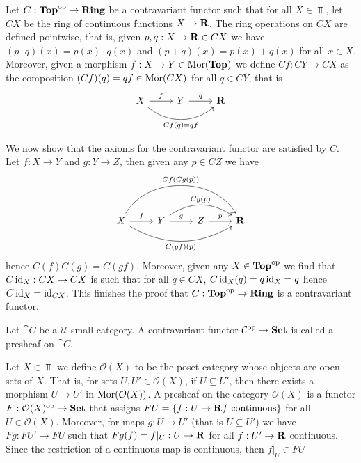 \begin{example}[\(\Top^\op \to \Rng\)]
Let \(C: {\textbf{Top}}^{\mathrm{op}} \to {\textbf{Ring}}\) be a contravariant functor such that
for all \(X \in \Top\), let \(C X\) be the ring of continuous functions
\(X \to \mathbf{R}\). The ring operations on \(C X\) are defined pointwise,
that is, given \(p, q: X \to \mathbf{R} \in C X\) we have \((p \cdot q) (x) =
p(x) \cdot q(x)\) and \((p + q)(x) = p(x) + q(x)\) for all \(x \in X\).
Moreover, given a morphism \(f: X \to Y \in \operatorname{Mor}({\textbf{Top}})\) we define \(C f:
C Y \to C X\) as the composition \((C f)(q) = q f \in \operatorname{Mor}(C X)\) for all \(q
\in C Y\), that is
\[
  \begin{tikzcd}
    X \ar[r, "f"] \ar[rr, bend right = 40, swap, "C f(q) = q f"]
    & Y \ar[r, "q"] & \R
  \end{tikzcd}
\]

We now show that the axioms for the contravariant functor are satisfied by
\(C\). Let \(f: X \to Y\) and \(g: Y \to Z\), then given any \(p \in C Z\) we
have
\[
  \begin{tikzcd}
    X \ar[r, "f"]
    \ar[rrr, bend left = 60, "C f(C g (p))"]
    \ar[rrr, bend right, swap, "C (g f)(p)"]
    & Y \ar[r, "g"]
    \ar[rr, bend left = 35, "C g(p)"]
    & Z \ar[r, "p"] & \R
  \end{tikzcd}
\]
hence \(C (f) C (g) = C (g f)\). Moreover, given any \(X \in {\textbf{Top}}^{\mathrm{op}}\)
we find that \(C \operatorname{id}_X: C X \to C X\) is such that for all \(q \in C X\), \(C
\operatorname{id}_X (q) = q \operatorname{id}_X = q\) hence \(C \operatorname{id}_X = \operatorname{id}_{C X}\). This finishes the
proof that \(C: {\textbf{Top}}^{\mathrm{op}} \to {\textbf{Ring}}\) is a contravariant functor.
\end{example}

\begin{definition}[Presheaf]\label{def: presheaf}
Let \(\cat C\) be a \(\mathcal U\)-small category. A contravariant functor
\(\mathcal C^{\mathrm{op}} \to {\textbf{Set}}\) is called a presheaf on \(\cat C\).
\end{definition}

\begin{example}
Let \(X \in \Top\) we define \(\mathcal O(X)\) to be the poset category
whose objects are open sets of \(X\). That is, for sets \(U, U' \in \mathcal
O(X)\), if \(U \subseteq U'\), then there exists a morphism \(U \to U'\) in
\(\operatorname{Mor}(\mathcal O(X))\). A presheaf on the category \(\mathcal O(X)\) is a
functor \(F: \mathcal O(X)^{\mathrm{op}} \to {\textbf{Set}}\) that assigns \(F U = \{f: U \to
\mathbf{R} \relax f \text{ continuous}\}\) for all \(U \in \mathcal O(X)\).
Moreover, for maps \(g: U \to U'\) (that is \(U \subseteq U'\)) we have \(F g:
F U' \to F U\) such that \(F g(f) = f|_U: U \to \mathbf{R}\) for all \(f: U'
\to \mathbf{R}\) continuous. Since the restriction of a continuous map is
continuous, then \(f|_U \in F U\)
\end{example}

